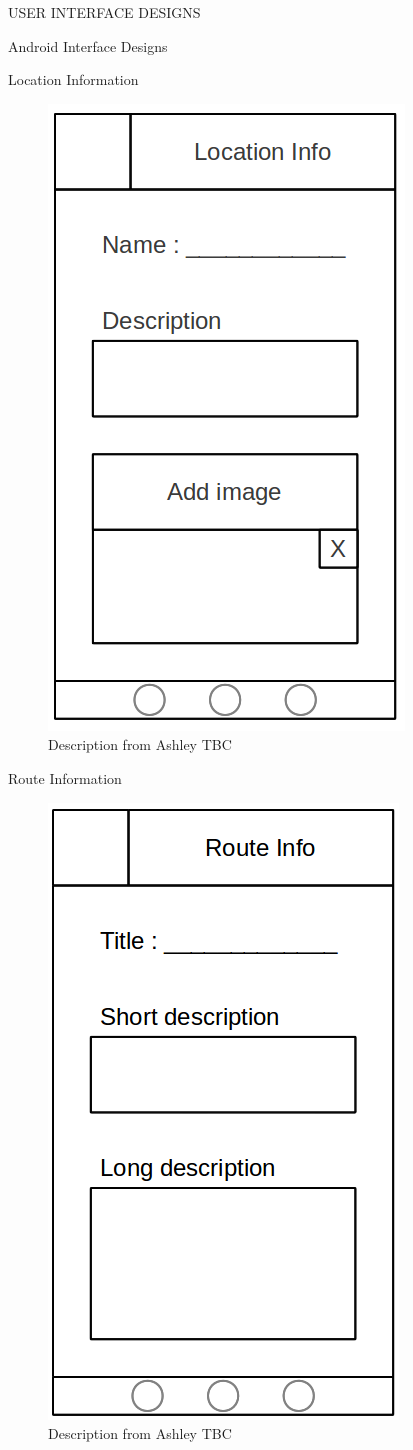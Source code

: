 \documentclass{article}
\begin{document}
\begin{section}{USER INTERFACE DESIGNS}
\begin{subsection}{Android Interface Designs}
			\clearpage
			\begin{subsubsection}{Location Information}
				\begin{figure}[h!]
					\begin{center}
						\includegraphics[height=0.45\columnwidth]{../Diagrams/AndroidUserInterface/source/locationInfo.png}
					\end{center}
					\caption{Description from Ashley TBC}
				\end{figure}
			\end{subsubsection}
			
			\begin{subsubsection}{Route Information}
				\begin{figure}[h!]
					\begin{center}
						\includegraphics[height=0.45\columnwidth]{../Diagrams/AndroidUserInterface/source/routeInfo.png}
					\end{center}
					\caption{Description from Ashley TBC}
				\end{figure}
			\end{subsubsection}
		\end{subsection}
		

\end{section}
\end{document}
